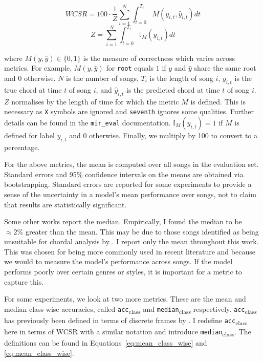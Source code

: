 \begin{equation}\label{eq:wcsr}
    WCSR = 100\cdot\frac{1}{Z}\sum_{i=1}^{N} \int_{t=0}^{T_i} M(y_{i,t},\hat{y}_{i,t}) dt
\end{equation}
\begin{equation}
    Z = \sum_{i=1}^{N} \int_{t=0}^{T_i} \mathbb{I}_M(y_{i,t}) dt
\end{equation}

where $M(y, \hat{y})\in\{0,1\}$ is the measure of correctness which varies across metrics. For example, $M(y, \hat{y})$ for \texttt{root} equals $1$ if $y$ and $\hat{y}$ share the same root and $0$ otherwise. $N$ is the number of songs, $T_i$ is the length of song $i$, $y_{i,t}$ is the true chord at time $t$ of song $i$, and $\hat{y}_{i,t}$ is the predicted chord at time $t$ of song $i$. $Z$ normalises by the length of time for which the metric $M$ is defined. This is necessary as \texttt{X} symbols are ignored and \texttt{seventh} ignores some qualities. Further details can be found in the \texttt{mir\_eval} documentation. $\mathbb{I}_M(y_{i,t})=1$ if $M$ is defined for label $y_{i,t}$ and $0$ otherwise. Finally, we multiply by 100 to convert to a percentage.

For the above metrics, the mean is computed over all songs in the evaluation set. Standard errors and 95\% confidence intervals on the means are obtained via bootstrapping. Standard errors are reported for some experiments to provide a sense of the uncertainty in a model's mean performance over songs, not to claim that results are statistically significant.

Some other works report the median. Empirically, I found the median to be $\approx 2\%$ greater than the mean. This may be due to those songs identified as being unsuitable for chordal analysis by \citet{FourTimelyInsights}. I report only the mean throughout this work. This was chosen for being more commonly used in recent literature and because we would to measure the model's performance across songs. If the model performs poorly over certain genres or styles, it is important for a metric to capture this.

For some experiments, we look at two more metrics. These are the mean and median class-wise accuracies, called \texttt{acc}\textsubscript{class} and \texttt{median}\textsubscript{class} respectively. \texttt{acc}\textsubscript{class} has previously been defined in terms of discrete frames by \citet{ACRLargeVocab1}. I redefine \texttt{acc}\textsubscript{class} here in terms of WCSR with a similar notation and introduce \texttt{median}\textsubscript{class}. The definitions can be found in Equations~\ref{eq:mean_class_wise} and \ref{eq:mean_class_wise}.

